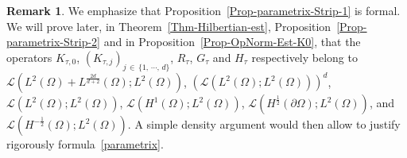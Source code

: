 \documentclass[10pt]{amsart}
\theoremstyle{definition}\newtheorem{defi}[theo]{Definition}\newtheorem{rema}[theo]{Remark}\newtheorem{exam}[theo]{Example}\newtheorem{exem}[theo]{Example}\newtheorem{nota}[theo]{Notation}
\newcommand{\scL}{\mathscr{L}}
\begin{document}
\begin{rema}
We emphasize that Proposition~\ref{Prop-parametrix-Strip-1} is formal. We will prove later, in Theorem~\ref{Thm-Hilbertian-est}, Proposition~\ref{Prop-parametrix-Strip-2} and in Proposition~\ref{Prop-OpNorm-Est-K0}, that the operators $K_{\tau,0}$, $(K_{\tau,j})_{j \,\in\,\{1,\,\cdots,\,d\} }$, $R_\tau$, $G_\tau$ and $H_{\tau}$ respectively belong to $\scL(L^{2}(\Omega) + L^{\frac{2d}{d+2}}(\Omega); L^2(\Omega))$, $(\scL(L^{2}(\Omega) ; L^2(\Omega)))^d$, $\scL(L^{2}(\Omega); L^2(\Omega))$, $\scL(H^{1}(\Omega); L^2(\Omega))$, $\scL(H^{\frac{1}{2}}(\partial\Omega); L^2(\Omega))$, and $\scL(H^{-\frac{1}{2}}(\Omega); L^2(\Omega))$. A simple density argument would then allow to justify rigorously formula~\eqref{parametrix}.
\end{rema}
\end{document}
